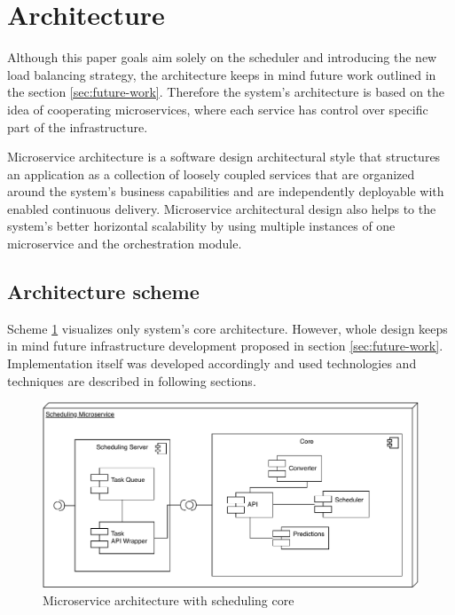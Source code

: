 \section{Architecture}\label{sec:architecture}

Although this paper goals aim solely on the scheduler and introducing the new load balancing strategy,
the architecture keeps in mind future work outlined in the section \ref{sec:future-work}.
Therefore the system's architecture is based on the idea of cooperating microservices,
where each service has control over specific part of the infrastructure. 

Microservice architecture is a software design architectural style 
that structures an application as a collection of loosely coupled services that 
are organized around the system's business capabilities\cite{namiot2014micro} 
and are independently deployable with enabled continuous delivery\cite{balalaie2016microservices}.
Microservice architectural design also helps to the system's better horizontal scalability
by using multiple instances of one microservice 
and the orchestration module.

\subsection{Architecture scheme}\label{subsec:architecture-scheme}
Scheme \ref{fig:scheduling-core-arch} visualizes only system's core architecture. 
However,
whole design keeps in mind future infrastructure development proposed in section \ref{sec:future-work}.
Implementation itself was developed accordingly 
and used technologies and techniques are described in following sections.

\begin{figure}[ht]
    \includegraphics[width=\textwidth]{i_scheduler.pdf} 
    \centering
    \caption{Microservice architecture with scheduling core}
    \label{fig:scheduling-core-arch}
\end{figure}

